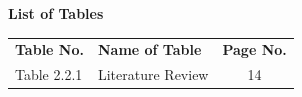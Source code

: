 \documentclass[12pt]{article}
\begin{document}
\begin{center}
    {\Large \bf List of Tables}
\end{center}

\vspace{1em}

\noindent
\begin{tabular}{l p{10cm} c}
\textbf{Table No.} & \textbf{Name of Table} & \textbf{Page No.} \\[6pt]
Table 2.2.1 & Literature Review & 14 \\
\end{tabular}
\end{document}
